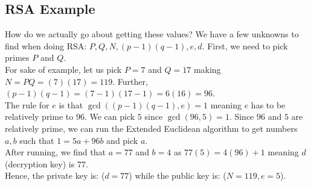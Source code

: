 \documentclass[14pt]{extarticle}
\begin{document}
    \pagebreak

    \subsection*{RSA Example}
    How do we actually go about getting these values? We have a few unknowns
    to find when doing RSA: $P, Q, N, (p-1)(q-1), e, d$. First, we need
    to pick primes $P$ and $Q$.\\

    For sake of example, let us pick $P = 7$ and $Q = 17$ making $N = PQ
    = (7)(17) = 119$. Further, $(p-1)(q-1) = (7-1)(17-1) = 6(16) = 96$.\\

    The rule for $e$ is that $\gcd((p-1)(q-1), e) = 1$ meaning $e$ has to be
    relatively prime to $96$. We can pick $5$ since $\gcd(96, 5) = 1$. Since
    $96$ and $5$ are relatively prime, we can run the Extended Euclidean 
    algorithm to get numbers $a, b$ such that $1 = 5a + 96b$ and pick $a$.\\

    After running, we find that $a = 77$ and $b = 4$ as $77(5) = 4(96) + 1$
    meaning $d$ (decryption key) is $77$.\\

    Hence, the private key is: ($d = 77$) while the public key is:
    ($N = 119, e = 5$).
\end{document}
